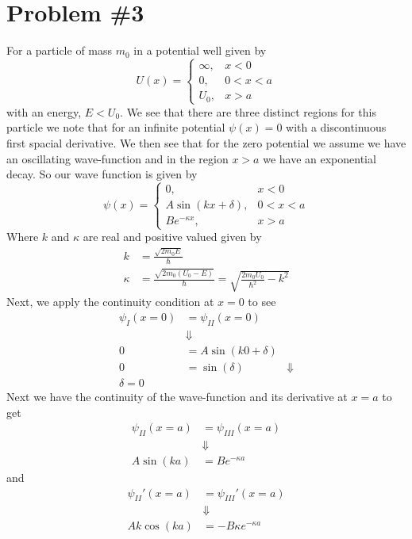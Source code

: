 \documentclass[11pt]{article}
\numberwithin{equation}{section}
\begin{document}
\pagebreak

\section{Problem \#3}
For a particle of mass $m_0$ in a potential well given by
$$U(x)=\left\{\begin{array}{cl}
               \infty,     &x<0\\
               0,          &0<x<a\\
               U_0,        &x>a
        \end{array}\right.$$
with an energy, $E<U_0$. We see that there are three distinct regions for this particle we
note that for an infinite potential $\psi(x)=0$ with a discontinuous first spacial derivative.
We then see that for the zero potential we assume we have an oscillating wave-function and
in the region $x>a$ we have an exponential decay. So our wave function is given by
$$\psi(x)=\left\{\begin{array}{ll}
               0,                        &x<0\\
               A\sin(kx+\delta),          &0<x<a\\
               Be^{-\kappa{x}},           &x>a
        \end{array}\right.$$
Where $k$ and $\kappa$ are real and positive valued given by
\begin{align*}
k &= \frac{\sqrt{2m_0E}}{\hbar}\\
\kappa &= \frac{\sqrt{2m_0(U_0-E)}}{\hbar} = \sqrt{\frac{2m_0U_0}{\hbar^2}-k^2}
\end{align*}
Next, we apply the continuity condition at $x=0$ to see
\begin{align*}
\psi_{I}(x=0) &= \psi_{II}(x=0)\\
&\Downarrow\\
0 &= A\sin(k0+\delta)\\
0 &= \sin(\delta)
&\Downarrow\\
\delta = 0
\end{align*}
Next we have the continuity of the wave-function and its derivative at $x=a$ to get
\begin{align*}
\psi_{II}(x=a) &= \psi_{III}(x=a)\\
&\Downarrow\\
A\sin(ka) &= Be^{-\kappa{a}}
\end{align*}
and 
\begin{align*}
\psi_{II}'(x=a) &= \psi_{III}'(x=a)\\
&\Downarrow\\
Ak\cos(ka) &= -B\kappa e^{-\kappa{a}}
\end{align*}
\end{document}
